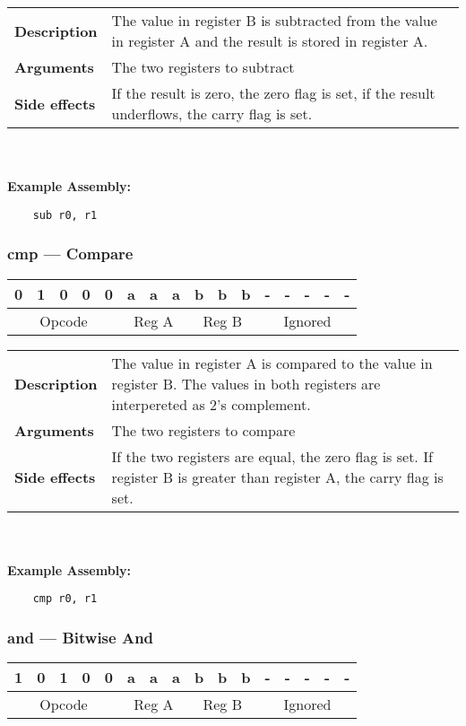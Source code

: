 \documentclass[titlepage]{article}
\begin{document}
\begin{tabular}{l p{8cm}}
{\bf Description} & The value in register B is subtracted from the value in register A and the result is stored in register A. \\
{\bf Arguments} & The two registers to subtract \\
{\bf Side effects} & If the result is zero, the zero flag is set, if the result underflows, the carry flag is set. \\
\end{tabular}\\ \\
{\bf Example Assembly:}
\begin{verbatim}
    sub r0, r1
\end{verbatim}

\subsubsection{cmp --- Compare}\begin{center}
\begin{tabular}{|c|c|c|c|c|c|c|c|c|c|c|c|c|c|c|c|}
\hline
0 & 1 & 0 & 0 & 0 & a & a & a & b & b & b & - & - & - & - & - \\
\hline
\multicolumn{5}{|c}{Opcode} &
\multicolumn{3}{|c}{Reg A} &
\multicolumn{3}{|c}{Reg B} &
\multicolumn{5}{|c|}{Ignored} \\
\hline
\end{tabular}
\end{center}

\begin{tabular}{l p{8cm}}
{\bf Description} & The value in register A is compared to the value in register B. The values in both registers are interpereted as 2's complement. \\
{\bf Arguments} & The two registers to compare \\
{\bf Side effects} & If the two registers are equal, the zero flag is set. If register B is greater than register A, the carry flag is set. \\
\end{tabular}\\ \\
{\bf Example Assembly:}
\begin{verbatim}
    cmp r0, r1
\end{verbatim}

\subsubsection{and --- Bitwise And}\begin{center}
\begin{tabular}{|c|c|c|c|c|c|c|c|c|c|c|c|c|c|c|c|}
\hline
1 & 0 & 1 & 0 & 0 & a & a & a & b & b & b & - & - & - & - & - \\
\hline
\multicolumn{5}{|c}{Opcode} &
\multicolumn{3}{|c}{Reg A} &
\multicolumn{3}{|c}{Reg B} &
\multicolumn{5}{|c|}{Ignored} \\
\hline
\end{tabular}
\end{center}
\end{document}
